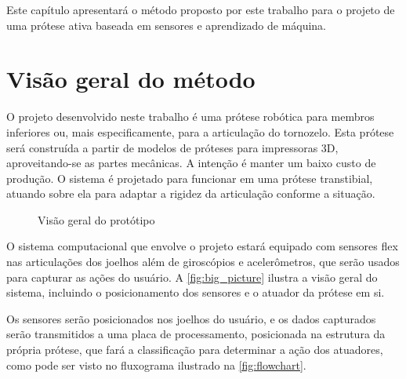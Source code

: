 Este capítulo apresentará o método proposto por este trabalho para o projeto de uma prótese ativa baseada em sensores e aprendizado de máquina.

\section{Visão geral do método}\label{sec:metodo_protese}

O projeto desenvolvido neste trabalho é uma prótese robótica para membros inferiores ou, mais especificamente, para a articulação do tornozelo. Esta prótese será construída a partir de modelos de próteses para impressoras 3D, aproveitando-se as partes mecânicas. A intenção é manter um baixo custo de produção. O sistema é projetado para funcionar em uma prótese transtibial, atuando sobre ela para adaptar a rigidez da articulação conforme a situação.

\begin{figure}[h]
	\caption{\label{fig:big_picture}Visão geral do protótipo}
	\begin{center}
	\end{center}
\end{figure}

O sistema computacional que envolve o projeto estará equipado com sensores flex nas articulações dos joelhos além de giroscópios e acelerômetros, que serão usados para capturar as ações do usuário. A \autoref{fig:big_picture} ilustra a visão geral do sistema, incluindo o posicionamento dos sensores e o atuador da prótese em si.

Os sensores serão posicionados nos joelhos do usuário, e os dados capturados serão transmitidos a uma placa de processamento, posicionada na estrutura da própria prótese, que fará a classificação para determinar a ação dos atuadores, como pode ser visto no fluxograma ilustrado na \autoref{fig:flowchart}.

